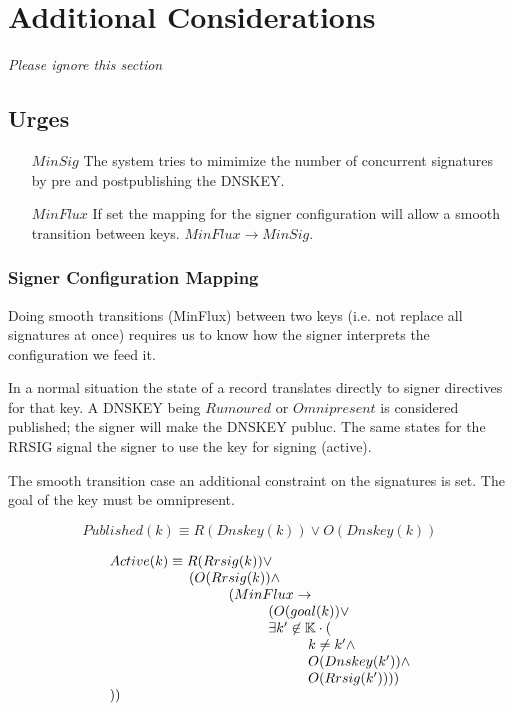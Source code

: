 \documentclass[twoside,english, a4paper]{article}
\begin{document}
\section{Additional Considerations}

\emph{Please ignore this section}

\subsection{Urges}


\begin{itemize}
\item[$MinSig$] The system tries to mimimize the number of concurrent
signatures by pre and postpublishing the DNSKEY.
\item[$MinFlux$] If set the mapping for 
the signer configuration will allow a smooth transition between keys.
$MinFlux \rightarrow MinSig$.
\end{itemize}

\subsubsection{Signer Configuration Mapping}

Doing smooth transitions (MinFlux) between two keys (i.e. not replace all 
signatures at once) requires us to know how the signer interprets the
configuration we feed it. 

In a normal situation the state of a record translates directly to 
signer directives for that key. A DNSKEY being $Rumoured$ or $Omnipresent$
is considered published; the signer will make the DNSKEY publuc. The
same states for the RRSIG signal the signer to use the key for signing 
(active).

The smooth transition case an additional constraint on the signatures 
is set. The goal of the key must be omnipresent.

\begin{equation}
Published(k) \equiv R(Dnskey(k)) \vee O(Dnskey(k))
\end{equation}

\begin{equation}
\begin{array}{l}
			Active(k) \equiv R(Rrsig(k)) \vee \\
\hskip 2cm 		(O(Rrsig(k)) \wedge \\
\hskip 3cm 			(MinFlux \rightarrow \\
\hskip 4cm 		(O(goal(k)) \vee \\
\hskip 4cm 		\exists k' \not \in \mathbb{K} \cdot (\\
\hskip 5cm			k\neq k' \wedge \\
\hskip 5cm			O(Dnskey(k')) \wedge \\
\hskip 5cm			O(Rrsig(k'))))\\
))
\end{array}
\end{equation}
\end{document}
